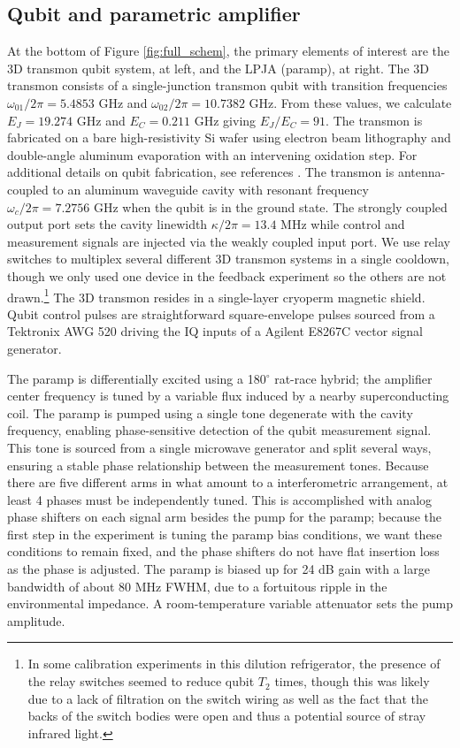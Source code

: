 \subsection{Qubit and parametric amplifier}

At the bottom of Figure \ref{fig:full_schem}, the primary elements of interest are the 3D transmon qubit system, at left, and the LPJA (paramp), at right.  The 3D transmon consists of a single-junction transmon qubit with transition frequencies $\omega _{01}/2\pi =5.4853$ GHz and $\omega _{02}/2\pi =10.7382$ GHz. From these values, we calculate $E_J=19.274$ GHz and $E_C=0.211$ GHz giving $E_J/E_C = 91$.  The transmon is fabricated on a bare high-resistivity Si wafer using electron beam lithography and double-angle aluminum evaporation with an intervening oxidation step.  For additional details on qubit fabrication, see references \cite{slichterthesis,Weber2014a}.  The transmon is antenna-coupled to an aluminum waveguide cavity with resonant frequency $\omega _{c}/2\pi =7.2756$ GHz when the qubit is in the ground state. The strongly coupled output port sets the cavity linewidth $\kappa/2\pi=13.4$ MHz while control and measurement signals are injected via the weakly coupled input port.  We use relay switches to multiplex several different 3D transmon systems in a single cooldown, though we only used one device in the feedback experiment so the others are not drawn.\footnote{In some calibration experiments in this dilution refrigerator, the presence of the relay switches seemed to reduce qubit $T_2$ times, though this was likely due to a lack of filtration on the switch wiring as well as the fact that the backs of the switch bodies were open and thus a potential source of stray infrared light.} The 3D transmon resides in a single-layer cryoperm magnetic shield.  Qubit control pulses are straightforward square-envelope pulses sourced from a Tektronix AWG 520 driving the IQ inputs of a Agilent E8267C vector signal generator.

The paramp is differentially excited using a 180$^\circ$ rat-race hybrid; the amplifier center frequency is tuned by a variable flux induced by a nearby superconducting coil.  The paramp is pumped using a single tone degenerate with the cavity frequency, enabling phase-sensitive detection of the qubit measurement signal.  This tone is sourced from a single microwave generator and split several ways, ensuring a stable phase relationship between the measurement tones.  Because there are five different arms in what amount to a interferometric arrangement, at least 4 phases must be independently tuned.  This is accomplished with analog phase shifters on each signal arm besides the pump for the paramp; because the first step in the experiment is tuning the paramp bias conditions, we want these conditions to remain fixed, and the phase shifters do not have flat insertion loss as the phase is adjusted.  The paramp is biased up for 24 dB gain with a large bandwidth of about 80 MHz FWHM, due to a fortuitous ripple in the environmental impedance.  A room-temperature variable attenuator sets the pump amplitude.

